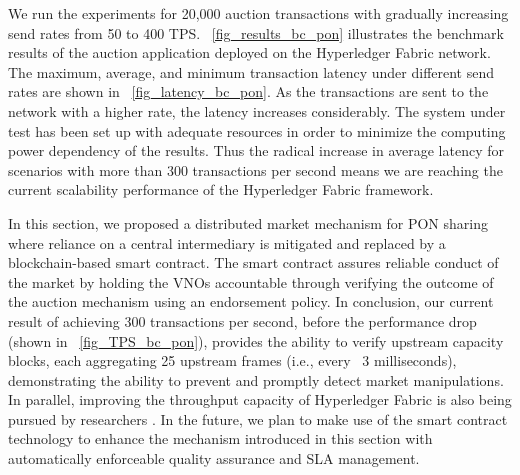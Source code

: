 

We run the experiments for 20,000 auction transactions with gradually increasing send rates from 50 to 400 \ac{TPS}. \figureautorefname~\ref{fig_results_bc_pon} illustrates the benchmark results of the auction application deployed on the Hyperledger Fabric network. The maximum, average, and minimum transaction latency under different send rates are shown in \figureautorefname~\ref{fig_latency_bc_pon}. As the transactions are sent to the network with a higher rate, the latency increases considerably. The system under test has been set up with adequate resources in order to minimize the computing power dependency of the results. Thus the radical increase in average latency for scenarios with more than 300 transactions per second means we are reaching the current scalability performance of the Hyperledger Fabric framework. %


In this section, we proposed a distributed market mechanism for \ac{PON} sharing where reliance on a central intermediary is mitigated and replaced by a blockchain-based smart contract. The smart contract assures reliable conduct of the market by holding the \acp{VNO} accountable through verifying the outcome of the auction mechanism using an endorsement policy.
In conclusion, our current result of achieving 300 transactions per second, before the performance drop (shown in \figureautorefname~\ref{fig_TPS_bc_pon}), provides the ability to verify upstream capacity blocks, each aggregating 25 upstream frames (i.e., every ~3 milliseconds), demonstrating the ability to prevent and promptly detect market manipulations.
In parallel, improving the throughput capacity of Hyperledger Fabric is also being pursued by researchers \cite{Gorenflo_2019}. In the future, we plan to make use of the smart contract technology to enhance the mechanism introduced in this section with automatically enforceable quality assurance and \ac{SLA} management.





